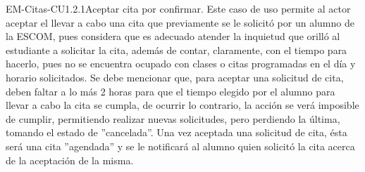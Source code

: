 \begin{UseCase}{EM-Citas-CU1.2.1}{Aceptar cita por confirmar.}
	{
	\noindent
	Este caso de uso permite al actor aceptar el llevar a cabo una cita que previamente se le solicitó por un alumno de la ESCOM, pues considera que es adecuado atender la inquietud que orilló al estudiante a solicitar la cita, además de contar, claramente, con el tiempo para hacerlo, pues no se encuentra ocupado con clases o citas programadas en el día y horario solicitados. Se debe mencionar que, para aceptar una solicitud de cita, deben faltar a lo más 2 horas para que el tiempo elegido por el alumno para llevar a cabo la cita se cumpla, de ocurrir lo contrario, la acción se verá imposible de cumplir, permitiendo realizar nuevas solicitudes, pero perdiendo la última, tomando el estado de ''cancelada''. Una vez aceptada una solicitud de cita, ésta será una cita ''agendada'' y se le notificará al alumno quien solicitó la cita acerca de la aceptación de la misma.
	\newline
	}
\end{UseCase}

